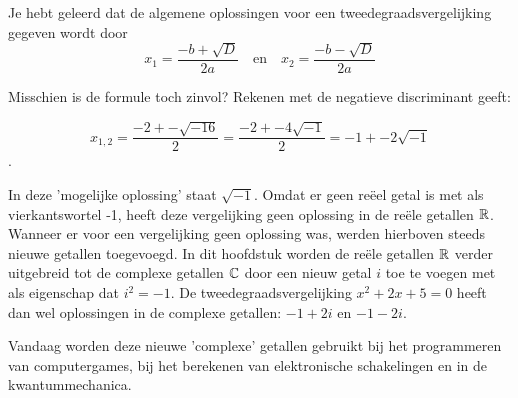 \documentclass{ximera}
\begin{document}
\begin{image}     
\end{image}
    
    
    





Je hebt geleerd dat de algemene oplossingen voor een tweedegraadsvergelijking gegeven wordt door 
\[  
    x_{1} = \frac{-b + \sqrt{D}}{2a} \quad \text{en} \quad
    x_{2} = \frac{-b - \sqrt{D}}{2a}
\]

Misschien is de formule toch zinvol? Rekenen met de negatieve discriminant geeft:

\[ x_{1,2} = \frac{-2 +- \sqrt{-16}}{2} = \frac{-2 +- 4\sqrt{-1}}{2} = -1 +- 2\sqrt{-1}\]. 

In deze 'mogelijke oplossing' staat \(\sqrt{-1}\). Omdat er geen reëel getal is met als vierkantswortel -1, heeft deze vergelijking geen oplossing in de reële getallen \(\mathbb{R}\). Wanneer er voor een vergelijking geen oplossing was, werden hierboven steeds nieuwe getallen toegevoegd. In dit hoofdstuk worden de reële getallen \(\mathbb{R}\) verder uitgebreid tot de complexe getallen \(\mathbb{C}\) door een nieuw getal \(i\) toe te voegen met als eigenschap dat \(i^2 = -1\). De tweedegraadsvergelijking \(x^2 + 2x + 5 = 0\) heeft dan wel oplossingen in de complexe getallen: \(-1 + 2i\)  en  \(-1-2i\).

Vandaag worden deze nieuwe 'complexe' getallen gebruikt bij het programmeren van computergames, bij het berekenen van elektronische schakelingen en in de kwantummechanica.
\end{document}
